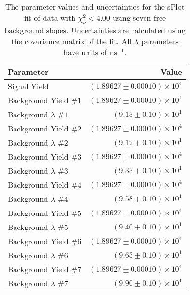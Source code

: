 
\begin{table}[ht]
    \begin{center}
        \begin{tabular}{lr}\toprule
            Parameter & Value \\\midrule
            Signal Yield & $(1.89627 \pm 0.00010) \times 10^{4}$ \\
            Background Yield $\#1$ & $(1.89627 \pm 0.00010) \times 10^{4}$ \\
            Background $\lambda$ $\#1$ & $(9.13 \pm 0.10) \times 10^{1}$ \\
            Background Yield $\#2$ & $(1.89627 \pm 0.00010) \times 10^{4}$ \\
            Background $\lambda$ $\#2$ & $(9.12 \pm 0.10) \times 10^{1}$ \\
            Background Yield $\#3$ & $(1.89627 \pm 0.00010) \times 10^{4}$ \\
            Background $\lambda$ $\#3$ & $(9.33 \pm 0.10) \times 10^{1}$ \\
            Background Yield $\#4$ & $(1.89627 \pm 0.00010) \times 10^{4}$ \\
            Background $\lambda$ $\#4$ & $(9.58 \pm 0.10) \times 10^{1}$ \\
            Background Yield $\#5$ & $(1.89627 \pm 0.00010) \times 10^{4}$ \\
            Background $\lambda$ $\#5$ & $(9.40 \pm 0.10) \times 10^{1}$ \\
            Background Yield $\#6$ & $(1.89627 \pm 0.00010) \times 10^{4}$ \\
            Background $\lambda$ $\#6$ & $(9.63 \pm 0.10) \times 10^{1}$ \\
            Background Yield $\#7$ & $(1.89627 \pm 0.00010) \times 10^{4}$ \\
            Background $\lambda$ $\#7$ & $(9.90 \pm 0.10) \times 10^{1}$ \\\bottomrule
        \end{tabular}
        \caption{The parameter values and uncertainties for the sPlot fit of data with $\chi^2_\nu < 4.00$ using seven free background slopes. Uncertainties are calculated using the covariance matrix of the fit. All $\lambda$ parameters have units of $\si{\nano\second}^{-1}$.}\label{tab:splot-fit-results-chisqdof-4.00-free-7}
    \end{center}
\end{table}
